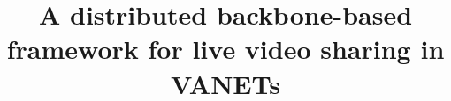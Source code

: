 \documentclass{acm_proc_article-sp}
\begin{document}
\title{A distributed backbone-based framework for live video sharing in VANETs}
%
%
%
%
%
\end{document}
